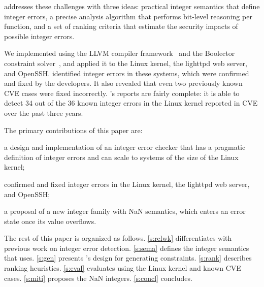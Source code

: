 \sys addresses these challenges with three ideas: practical integer
semantics that define integer errors, a precise analysis algorithm
that performs bit-level reasoning per function, and a set of ranking
criteria that estimate the security impacts of possible integer
errors.

We implemented \sys using the LLVM compiler framework~\cite{lattner:llvm}
and the Boolector constraint solver~\cite{boolector}, and applied it
to the Linux kernel, the lighttpd web server, and OpenSSH\@.  \sys
identified \nrbugs integer errors in these systems, which were
confirmed and fixed by the developers.  It also revealed that even
two previously known CVE cases were fixed incorrectly.
\sys's reports are fairly complete: it is able to detect 34 out of the
36 known integer errors in the Linux kernel reported in CVE over the past
three years.

%

The primary contributions of this paper are:
\begin{CompactItemize}
\item a design and implementation of an integer error checker that has a 
  pragmatic definition of integer errors and can scale to systems of the 
  size of the Linux kernel;
\item \nrbugs confirmed and fixed integer errors in
  the Linux kernel, the lighttpd web server, and OpenSSH;
\item a proposal of a new integer family with NaN semantics, which
  enters an error state once its value overflows. 
\end{CompactItemize}

The rest of this paper is organized as follows.
\autoref{s:relwk} differentiates \sys with previous work on integer 
error detection. \autoref{s:sema}
defines the integer semantics that \sys uses.  \autoref{s:gen}
presents \sys's design for generating constraints.  \autoref{s:rank}
describes ranking heuristics.  \autoref{s:eval} evaluates \sys using
the Linux kernel and known CVE cases.
\autoref{s:miti} proposes the NaN integers.
\autoref{s:concl} concludes.

